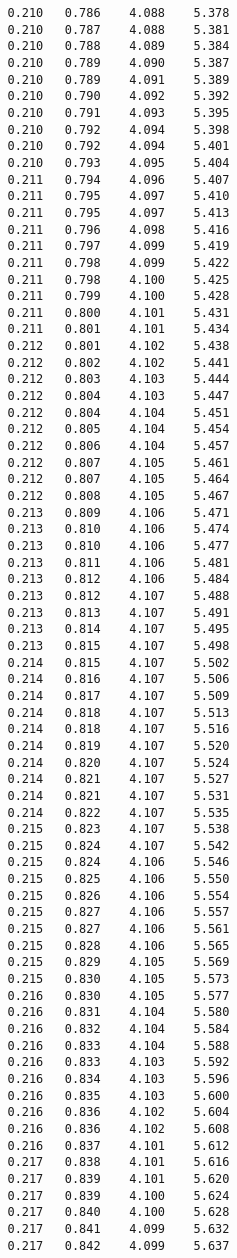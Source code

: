 \begin{verbatim}
   0.210   0.786    4.088    5.378
   0.210   0.787    4.088    5.381
   0.210   0.788    4.089    5.384
   0.210   0.789    4.090    5.387
   0.210   0.789    4.091    5.389
   0.210   0.790    4.092    5.392
   0.210   0.791    4.093    5.395
   0.210   0.792    4.094    5.398
   0.210   0.792    4.094    5.401
   0.210   0.793    4.095    5.404
   0.211   0.794    4.096    5.407
   0.211   0.795    4.097    5.410
   0.211   0.795    4.097    5.413
   0.211   0.796    4.098    5.416
   0.211   0.797    4.099    5.419
   0.211   0.798    4.099    5.422
   0.211   0.798    4.100    5.425
   0.211   0.799    4.100    5.428
   0.211   0.800    4.101    5.431
   0.211   0.801    4.101    5.434
   0.212   0.801    4.102    5.438
   0.212   0.802    4.102    5.441
   0.212   0.803    4.103    5.444
   0.212   0.804    4.103    5.447
   0.212   0.804    4.104    5.451
   0.212   0.805    4.104    5.454
   0.212   0.806    4.104    5.457
   0.212   0.807    4.105    5.461
   0.212   0.807    4.105    5.464
   0.212   0.808    4.105    5.467
   0.213   0.809    4.106    5.471
   0.213   0.810    4.106    5.474
   0.213   0.810    4.106    5.477
   0.213   0.811    4.106    5.481
   0.213   0.812    4.106    5.484
   0.213   0.812    4.107    5.488
   0.213   0.813    4.107    5.491
   0.213   0.814    4.107    5.495
   0.213   0.815    4.107    5.498
   0.214   0.815    4.107    5.502
   0.214   0.816    4.107    5.506
   0.214   0.817    4.107    5.509
   0.214   0.818    4.107    5.513
   0.214   0.818    4.107    5.516
   0.214   0.819    4.107    5.520
   0.214   0.820    4.107    5.524
   0.214   0.821    4.107    5.527
   0.214   0.821    4.107    5.531
   0.214   0.822    4.107    5.535
   0.215   0.823    4.107    5.538
   0.215   0.824    4.107    5.542
   0.215   0.824    4.106    5.546
   0.215   0.825    4.106    5.550
   0.215   0.826    4.106    5.554
   0.215   0.827    4.106    5.557
   0.215   0.827    4.106    5.561
   0.215   0.828    4.106    5.565
   0.215   0.829    4.105    5.569
   0.215   0.830    4.105    5.573
   0.216   0.830    4.105    5.577
   0.216   0.831    4.104    5.580
   0.216   0.832    4.104    5.584
   0.216   0.833    4.104    5.588
   0.216   0.833    4.103    5.592
   0.216   0.834    4.103    5.596
   0.216   0.835    4.103    5.600
   0.216   0.836    4.102    5.604
   0.216   0.836    4.102    5.608
   0.216   0.837    4.101    5.612
   0.217   0.838    4.101    5.616
   0.217   0.839    4.101    5.620
   0.217   0.839    4.100    5.624
   0.217   0.840    4.100    5.628
   0.217   0.841    4.099    5.632
   0.217   0.842    4.099    5.637

\end{verbatim}
